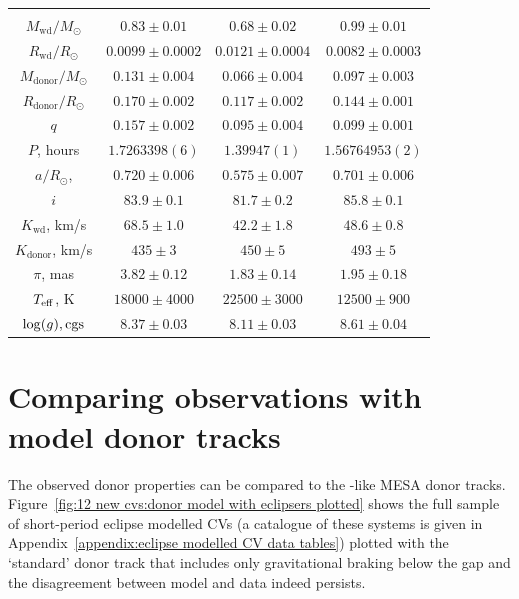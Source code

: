 \begin{table}
\begin{tabular}{cccc}
        \hline \hline \\
        $M_\mathrm{wd}/M_\odot$     & $0.83\pm0.01$     & $0.68\pm0.02$          & $0.99\pm0.01$           \\
        $R_\mathrm{wd}/R_\odot$     & $0.0099\pm0.0002$ & $0.0121\pm0.0004$      & $0.0082\pm0.0003$       \\
        $M_\mathrm{donor}/M_\odot$  & $0.131\pm0.004$   & $0.066\pm0.004$        & $0.097\pm0.003$         \\
        $R_\mathrm{donor}/R_\odot$  & $0.170\pm0.002$   & $0.117\pm0.002$        & $0.144\pm0.001$         \\
        $q$                         & $0.157\pm0.002$   & $0.095\pm0.004$        & $0.099\pm0.001$         \\
        \hline
        $P$, hours                  & $1.7263398(6)$    & $1.39947(1)$           & $1.56764953(2)$         \\
        $a/R_\odot$,                & $0.720\pm0.006$   & $0.575\pm0.007$        & $0.701\pm0.006$       \\
        $i$                         & $83.9\pm0.1$      & $81.7\pm0.2$           & $85.8\pm0.1$            \\
        $K_\mathrm{wd}$, km/s       & $68.5\pm1.0$      & $42.2\pm1.8$           & $48.6\pm0.8$            \\
        $K_\mathrm{donor}$, km/s    & $435\pm3$         & $450\pm5$              & $493\pm5$               \\
        \hline
        $\pi$, mas                  & $3.82\pm0.12$     & $1.83\pm0.14$          & $1.95\pm0.18$           \\
        $T_{\rm eff}$, K            & $18000\pm4000$    & $22500\pm3000$         & $12500\pm900$          \\
        $\log(g), {\rm cgs}$        & $8.37\pm0.03$     & $8.11\pm0.03$          & $8.61\pm0.04$           \\
        \hline
        \hline
    \end{tabular}
\end{table}



\section{Comparing observations with model donor tracks}
\label{sect:12 new cvs:eclipse modelling of 12 CVs}

The observed donor properties can be compared to the \citet{knigge11}-like MESA donor tracks. Figure~\ref{fig:12 new cvs:donor model with eclipsers plotted} shows the full sample of short-period eclipse modelled CVs (a catalogue of these systems is given in Appendix~\ref{appendix:eclipse modelled CV data tables}) plotted with the `standard' donor track that includes only gravitational braking below the gap and the disagreement between model and data indeed persists.

